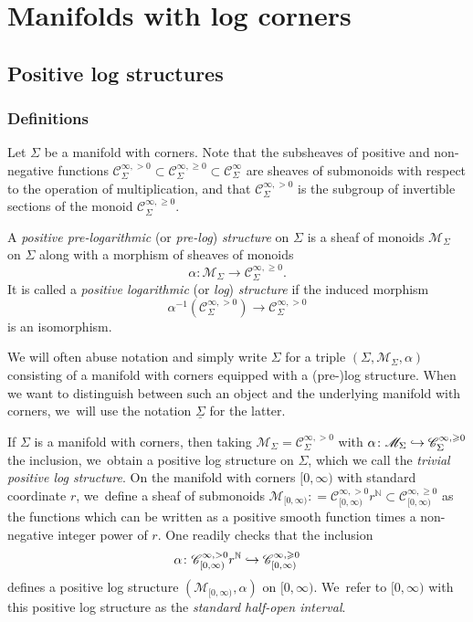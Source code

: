 \documentclass[10pt]{amsart}
\newcommand\hto{\mathrel{\lhook\joinrel\to}}
\theoremstyle{definition}
\theoremstyle{remark}
\newenvironment{example}
  {\pushQED{\qed}\renewcommand{\qedsymbol}{$\lozenge$}\examplex}
  {\popQED\endexamplex}
\let\defn\emph
\newcommand{\NN}{\mathbb{N}}
\newcommand{\halfspc}[1]{[0,\infty)^{#1}}
\renewcommand{\ge}{\geqslant}
\newcommand{\defas}{\mathrel{\mathop:}=}
\newcommand{\cM}{\mathscr{M}}
\newcommand{\Cinf}[1]{\mathscr{C}^{\infty}_{#1}}
\newcommand{\Cinfpos}[1]{\mathscr{C}^{\infty, > 0}_{#1}}
\newcommand{\Cinfge}[1]{\mathscr{C}^{\infty, \ge 0}_{#1}}
\newcommand{\Sig}{\Sigma}
\newcommand{\uSig}{\underline{\Sigma}}
\let\Subsection\subsection\let\Subsubsection\subsubsection
\begin{document}
\section{Manifolds with log corners}\label{sec:log-corners}

\Subsection{Positive log structures}\label{sec:log-structures}

\subsubsection{Definitions}

Let $\Sig$ be a manifold with corners. Note that the subsheaves of positive and non-negative functions $\Cinfpos{\Sig} \subset \Cinfge{\Sig} \subset \Cinf{\Sig}$
are sheaves of submonoids with respect to the operation of multiplication, and that $\Cinfpos{\Sig}$ is the subgroup of invertible sections of the monoid $\Cinfge{\Sig}$.

\begin{definition}
A \defn{positive pre-logarithmic} (or \defn{pre-log}) \defn{structure} on $\Sig$ is a sheaf of monoids $\cM_\Sig$ on $\Sig$ along with a morphism of sheaves of monoids
\[
\alpha\colon \cM_\Sig\to \Cinfge{\Sig}.
\]
It is called a \defn{positive logarithmic} (or \defn{log}) \defn{structure} if the induced morphism
\[
\alpha^{-1}(\Cinfpos{\Sig})\to \Cinfpos{\Sig}
\]
is an isomorphism.
\end{definition}
We will often abuse notation and simply write $\Sig$ for a triple $(\Sig,\cM_\Sig,\alpha)$ consisting of a manifold with corners equipped with a (pre-)log structure. When we want to distinguish between such an object and the underlying manifold with corners, we~will use the notation $\uSig$ for the latter.

\begin{example}\label{ex:trivial}
If $\Sig$ is a manifold with corners, then taking $\cM_{\Sig} = \Cinfpos{\Sig}$ with $\alpha\colon \cM_{\Sig} \hto \Cinfge{\Sig}$ the inclusion, we~obtain a positive log structure on $\Sig$, which we call the \defn{trivial positive log structure}.
\end{example}
\begin{example}\label{ex:interval}
On the manifold with corners $[0,\infty)$ with standard coordinate $r$, we~define a sheaf of submonoids $\cM_{[0,\infty)}\defas \Cinfpos{[0,\infty)}r^{\NN}\subset \Cinfge{\halfspc{}}$ as the functions which can be written as a positive smooth function times a non-negative integer power of $r$. One readily checks that the inclusion\vspace*{-3pt}
\[
\alpha\colon \Cinfpos{[0,\infty)}r^\NN \hto \Cinfge{[0,\infty)}
\]
defines a positive log structure $(\cM_{\halfspc{}},\alpha)$ on $[0,\infty)$. We~refer to $[0,\infty)$ with this positive log structure as the \defn{standard half-open interval}.
\end{example}
\end{document}
